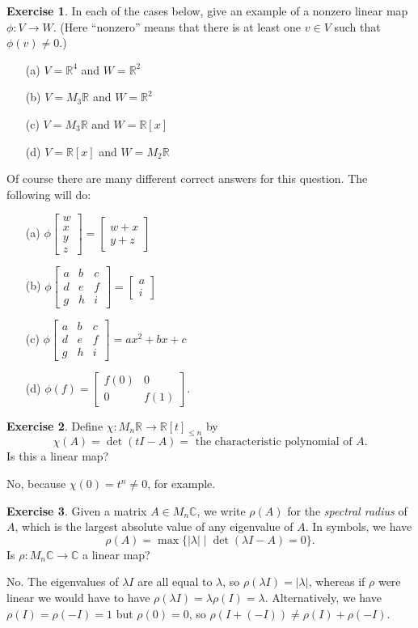 \documentclass{amsart}
\newcommand{\R}         {{\mathbb{R}}}
\newcommand{\C}         {{\mathbb{C}}}
\newcommand{\bsm}       {\left[\begin{smallmatrix}}
\newcommand{\esm}       {\end{smallmatrix}\right]}
\newcommand{\lm}        {\lambda}
\newcommand{\xra}       {\xrightarrow}
\newcommand{\st}        {\;|\;}
\renewcommand{\:}       {\colon}
\theoremstyle{definition}
\newtheorem{exercise}{Exercise}[section]
\renewenvironment{solution}{\SolutionAtEnd}{\endSolutionAtEnd}
\begin{document}
\begin{exercise}
 In each of the cases below, give an example of a nonzero
 linear map $\phi\:V\to W$.  (Here ``nonzero'' means that
 there is at least one $v\in V$ such that $\phi(v)\neq 0$.)
 \begin{itemize}
  \item[(a)] $V=\R^4$ and $W=\R^2$
  \item[(b)] $V=M_3\R$ and $W=\R^2$
  \item[(c)] $V=M_3\R$ and $W=\R[x]$
  \item[(d)] $V=\R[x]$ and $W=M_2\R$
 \end{itemize}
\end{exercise}
\begin{solution}
 Of course there are many different correct answers for this
 question.  The following will do:
 \begin{itemize}
  \item[(a)] $\phi\bsm w\\ x\\ y\\ z\esm=\bsm w+x\\ y+z\esm$
  \item[(b)] $\phi\bsm a&b&c \\ d&e&f\\ g&h&i\esm = \bsm a\\ i\esm$
  \item[(c)] $\phi\bsm a&b&c \\ d&e&f\\ g&h&i\esm = ax^2+bx+c$
  \item[(d)] $\phi(f)=\bsm f(0) & 0 \\ 0 & f(1) \esm$.
 \end{itemize}
\end{solution}
\begin{exercise}
 Define $\chi\:M_n\R\xra{}\R[t]_{\leq n}$ by
 \[ \chi(A) = \det(tI-A) =
      \text{ the characteristic polynomial of } A.
 \]
 Is this a linear map?
\end{exercise}
\begin{solution}
 No, because $\chi(0)=t^n\neq 0$, for example.
\end{solution}
\begin{exercise}
 Given a matrix $A\in M_n\C$, we write $\rho(A)$ for the
 \emph{spectral radius} of $A$, which is the largest
 absolute value of any eigenvalue of $A$.  In symbols, we
 have 
 \[ \rho(A) = \max\{|\lm| \st \det(\lm I - A)=0\}. \]
 Is $\rho\:M_n\C\to\C$ a linear map?
\end{exercise}
\begin{solution}
 No.  The eigenvalues of $\lm I$ are all equal to $\lm$, so
 $\rho(\lm I)=|\lm|$, whereas if $\rho$ were linear we would
 have to have $\rho(\lm I)=\lm\rho(I)=\lm$.  Alternatively,
 we have $\rho(I)=\rho(-I)=1$ but $\rho(0)=0$, so
 $\rho(I+(-I))\neq\rho(I)+\rho(-I)$.  
\end{solution}
\end{document}
